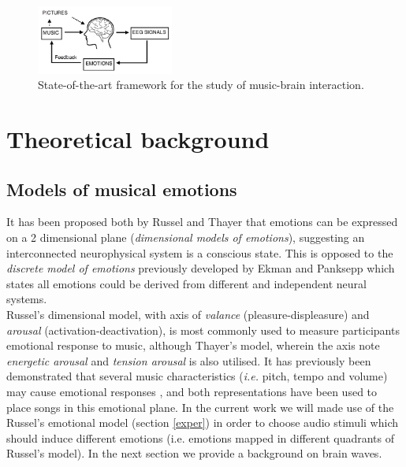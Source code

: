 \documentclass[twocolumn,superscriptaddress]{revtex4-1}
\theoremstyle{definition}
\theoremstyle{remark}
\begin{document}
\begin{figure}[h!]
  \centering
      \includegraphics[width=0.4\textwidth]{figures/theory}
  \caption{\label{theory}  State-of-the-art framework for the study of music-brain interaction.}
\end{figure}






\section{Theoretical background} \label{teoria}%



\subsection{Models of musical emotions}

It has been proposed both by Russel\cite{musictype} and Thayer\cite{musictype2} that emotions can be  expressed on a 2 dimensional plane (\textit{dimensional models of emotions}), suggesting an interconnected neurophysical system is a conscious state. This is opposed to the \textit{discrete model of emotions} previously developed by Ekman \cite{ekman} and Panksepp \cite{pankssep} which states all emotions could be derived from different and independent neural systems. \\
Russel's dimensional model, with axis of \emph{valance} (pleasure-displeasure) and \emph{arousal} (activation-deactivation), is most commonly used  to measure participants emotional response to music, although Thayer's model, wherein the axis note \emph{energetic arousal} and \emph{tension arousal} is also utilised. It has previously been demonstrated that several music characteristics (\emph{i.e.} pitch, tempo and volume) may cause emotional responses \cite{juslin}, and both representations have been used to place songs in this emotional plane. In the current work we will made use of the Russel's emotional model (section \ref{exper}) in order to choose audio stimuli which should induce different emotions (i.e. emotions mapped in different quadrants of Russel's model). In the next section we provide a background on brain waves.
\end{document}
